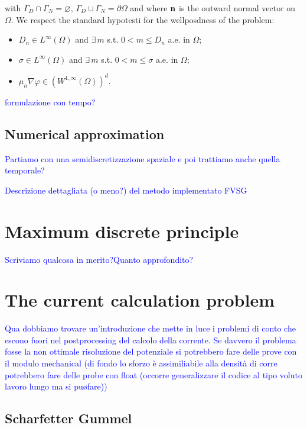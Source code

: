 with $\Gamma_D\cap\Gamma_N=\varnothing$, $\Gamma_D\cup\Gamma_N=\partial \Omega$ and where $\mathbf{n}$ is the outward normal vector on $\Omega$.
We respect the standard hypotesti for the wellposdness of the problem:
\begin{itemize}
\item $D_n \in L^{\infty}(\Omega)$ and $\exists \, m$ s.t. $0<m\leq D_n$ a.e. in $\Omega$;
\item $\sigma \in L^{\infty}(\Omega)$ and $\exists \, m$ s.t. $0<m\leq \sigma$ a.e. in $\Omega$;
\item $\mu_n \nabla \varphi \in (W^{1,\infty}(\Omega))^d$.
\end{itemize}

\textcolor{blue}{formulazione con tempo?}


\subsection{Numerical approximation}

\textcolor{blue}{Partiamo con una semidiscretizzazione spaziale e poi trattiamo anche quella temporale?}

\textcolor{blue}{Descrizione dettagliata (o meno?) del metodo implementato FVSG}

\section{Maximum discrete principle}
\textcolor{blue}{Scriviamo qualcosa in merito?Quanto approfondito?}


\section{The current calculation problem}

\textcolor{blue}{Qua dobbiamo trovare un'introduzione che mette in luce i problemi di conto che escono fuori nel postprocessing del calcolo della corrente. Se davvero il problema fosse la non ottimale risoluzione del potenziale si potrebbero fare delle prove con il modulo mechanical (di fondo lo sforzo \`e assimiliabile alla densit\`a di corre potrebbero fare delle probe con float (occorre generalizzare il codice al tipo voluto lavoro lungo ma si pu\o fare))}

\subsection{Scharfetter Gummel}

